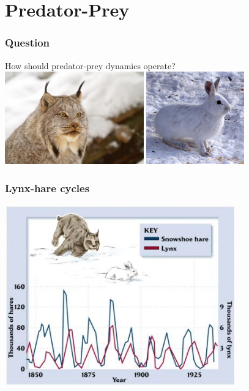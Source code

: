 \documentclass[color=usenames,dvipsnames]{beamer}\usepackage[]{graphicx}\usepackage[]{color}
\begin{document}
\section{Predator-Prey}



\begin{frame}
  \frametitle{Question}
  \Large
  How should predator-prey dynamics operate? \\
  \pause
  \vspace{1cm}  \includegraphics[height=4cm,keepaspectratio]{figs/Canada_lynx_portrait_by_Michael_Zahra} \hfill
\includegraphics[height=4cm,keepaspectratio]{figs/Snowshoe_Hare,_Shirleys_Bay}
\end{frame}




\begin{frame}
  \frametitle{Lynx-hare cycles}
  \centering
  \includegraphics[width=0.75\textwidth]{figs/lynx-hare} \par
\end{frame}
\end{document}

